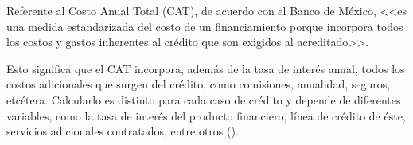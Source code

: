\documentclass[12pt]{article}
\begin{document}
            Referente al Costo Anual Total (CAT), de acuerdo con el Banco de México, <<es una medida estandarizada del costo de un financiamiento porque incorpora todos los costos y gastos inherentes al crédito que son exigidos al acreditado>>.
            
            Esto significa que el CAT incorpora, además de la tasa de interés anual, todos los costos adicionales que surgen del crédito, como comisiones, anualidad, seguros, etcétera. Calcularlo es distinto para cada caso de crédito y depende de diferentes variables, como la tasa de interés del producto financiero, línea de crédito de éste, servicios adicionales contratados, entre otros (\cite{catytasa-bbva}).



    \printbibliography
\end{document}
